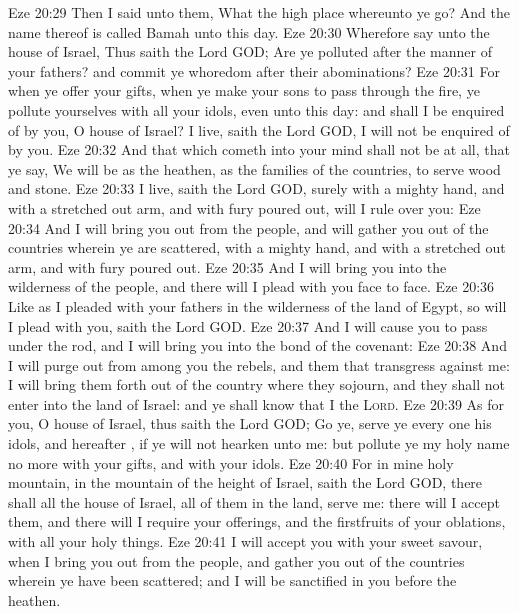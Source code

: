 \vs Eze 20:29 Then I said unto them, What  the high place whereunto ye go? And the name thereof is called Bamah unto this day.
\vs Eze 20:30 Wherefore say unto the house of Israel, Thus saith the Lord GOD; Are ye polluted after the manner of your fathers? and commit ye whoredom after their abominations?
\vs Eze 20:31 For when ye offer your gifts, when ye make your sons to pass through the fire, ye pollute yourselves with all your idols, even unto this day: and shall I be enquired of by you, O house of Israel?  I live, saith the Lord GOD, I will not be enquired of by you.
\vs Eze 20:32 And that which cometh into your mind shall not be at all, that ye say, We will be as the heathen, as the families of the countries, to serve wood and stone.
\vs Eze 20:33  I live, saith the Lord GOD, surely with a mighty hand, and with a stretched out arm, and with fury poured out, will I rule over you:
\vs Eze 20:34 And I will bring you out from the people, and will gather you out of the countries wherein ye are scattered, with a mighty hand, and with a stretched out arm, and with fury poured out.
\vs Eze 20:35 And I will bring you into the wilderness of the people, and there will I plead with you face to face.
\vs Eze 20:36 Like as I pleaded with your fathers in the wilderness of the land of Egypt, so will I plead with you, saith the Lord GOD.
\vs Eze 20:37 And I will cause you to pass under the rod, and I will bring you into the bond of the covenant:
\vs Eze 20:38 And I will purge out from among you the rebels, and them that transgress against me: I will bring them forth out of the country where they sojourn, and they shall not enter into the land of Israel: and ye shall know that I  the \textsc{Lord}.
\vs Eze 20:39 As for you, O house of Israel, thus saith the Lord GOD; Go ye, serve ye every one his idols, and hereafter , if ye will not hearken unto me: but pollute ye my holy name no more with your gifts, and with your idols.
\vs Eze 20:40 For in mine holy mountain, in the mountain of the height of Israel, saith the Lord GOD, there shall all the house of Israel, all of them in the land, serve me: there will I accept them, and there will I require your offerings, and the firstfruits of your oblations, with all your holy things.
\vs Eze 20:41 I will accept you with your sweet savour, when I bring you out from the people, and gather you out of the countries wherein ye have been scattered; and I will be sanctified in you before the heathen.
